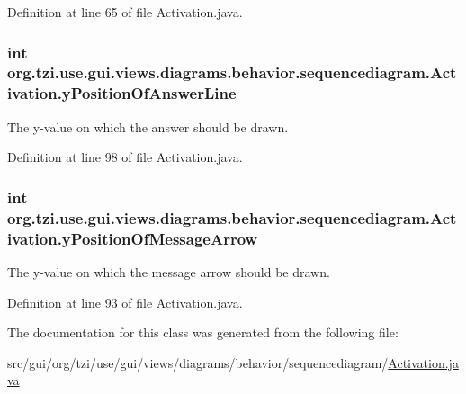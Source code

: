 Definition at line 65 of file Activation.\-java.

\hypertarget{classorg_1_1tzi_1_1use_1_1gui_1_1views_1_1diagrams_1_1behavior_1_1sequencediagram_1_1_activation_aba78cda32154fd25d416681036e53d97}{
\subsubsection[{y\-Position\-Of\-Answer\-Line}]{\setlength{\rightskip}{0pt plus 5cm}int org.\-tzi.\-use.\-gui.\-views.\-diagrams.\-behavior.\-sequencediagram.\-Activation.\-y\-Position\-Of\-Answer\-Line\hspace{0.3cm}{\ttfamily [protected]}}}\label{classorg_1_1tzi_1_1use_1_1gui_1_1views_1_1diagrams_1_1behavior_1_1sequencediagram_1_1_activation_aba78cda32154fd25d416681036e53d97}
The y-\/value on which the answer should be drawn. 

Definition at line 98 of file Activation.\-java.

\hypertarget{classorg_1_1tzi_1_1use_1_1gui_1_1views_1_1diagrams_1_1behavior_1_1sequencediagram_1_1_activation_ac53c18218c69b1ef3282b24b2c1b6752}{
\subsubsection[{y\-Position\-Of\-Message\-Arrow}]{\setlength{\rightskip}{0pt plus 5cm}int org.\-tzi.\-use.\-gui.\-views.\-diagrams.\-behavior.\-sequencediagram.\-Activation.\-y\-Position\-Of\-Message\-Arrow\hspace{0.3cm}{\ttfamily [protected]}}}\label{classorg_1_1tzi_1_1use_1_1gui_1_1views_1_1diagrams_1_1behavior_1_1sequencediagram_1_1_activation_ac53c18218c69b1ef3282b24b2c1b6752}
The y-\/value on which the message arrow should be drawn. 

Definition at line 93 of file Activation.\-java.



The documentation for this class was generated from the following file\-:\begin{DoxyCompactItemize}
\item 
src/gui/org/tzi/use/gui/views/diagrams/behavior/sequencediagram/\hyperlink{_activation_8java}{Activation.\-java}\end{DoxyCompactItemize}

